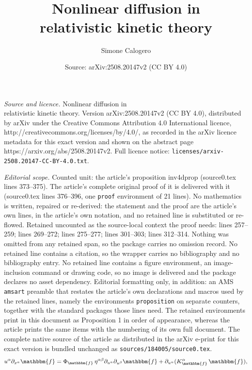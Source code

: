 \documentclass[10pt,a4paper]{amsart}
\title{\Huge{Nonlinear diffusion in\\ relativistic kinetic theory}}
\author{Simone Calogero}
\date{Source: arXiv:2508.20147v2 (CC BY 4.0)}
\begin{document}
\maketitle

\noindent\emph{Source and licence.} \Huge{Nonlinear diffusion in\\ relativistic kinetic theory}. Version arXiv:2508.20147v2 (CC BY 4.0), distributed by arXiv under the Creative Commons Attribution 4.0 International licence, http://creativecommons.org/licenses/by/4.0/, as recorded in the arXiv licence metadata for this exact version and shown on the abstract page https://arxiv.org/abs/2508.20147v2. Full licence notice: \texttt{licenses/arxiv-2508.20147-CC-BY-4.0.txt}.\par\smallskip

\noindent\textit{Editorial scope.} Counted unit: the article's proposition inv4dprop (source0.tex lines 373--375). The article's complete original proof of it is delivered with it (source0.tex lines 376--396, one \texttt{proof} environment of 21 lines). No mathematics is written, repaired or re-derived: the statement and the proof are the article's own lines, in the article's own notation, and no retained line is substituted or re-flowed.  Retained uncounted as the source-local context the proof needs: lines 257--259; lines 269--272; lines 275--277; lines 301--303; lines 312--314.  Nothing was omitted from any retained span, so the package carries no omission record.  No retained line contains a citation, so the wrapper carries no bibliography and no bibliography entry.  No retained line contains a figure environment, an image-inclusion command or drawing code, so no image is delivered and the package declares no asset dependency.  Editorial formatting only, in addition: an AMS \texttt{amsart} preamble that restates the article's own declarations and macros used by the retained lines, namely the environments \texttt{proposition} on separate counters, together with the standard packages those lines need.  The retained environments print in this document as Proposition 1 in order of appearance, whereas the article prints the same items with the numbering of its own full document.  The complete native source of the article as distributed in the arXiv e-print for this exact version is bundled unchanged as \texttt{sources/184005/source0.tex}.
\begin{equation}\label{eqf*}
u^\alpha\partial_{x^\alpha}\mathbbm{f}=\Phi_\mathbbm{f} \, \eta^{\alpha\beta}\partial_{u^\alpha}\partial_{u^\beta} \mathbbm{f}+\partial_{u^\alpha} (K_\mathbbm{f}^\alpha \, \mathbbm{f}),
\end{equation}
\end{document}
